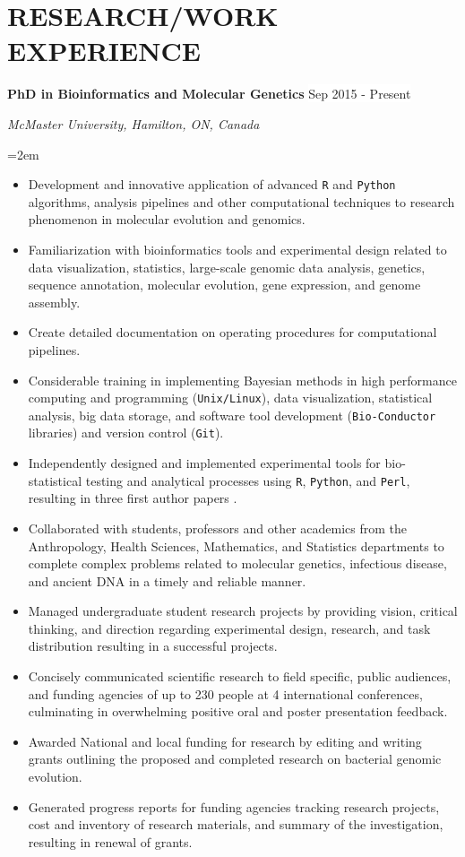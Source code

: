 \documentclass[paper=a4,fontsize=11pt]{scrartcl}	 			%
\newcommand{\NewPart}[1]{\section*{\uppercase{#1}}}
\newcommand{\EducationEntry}[4]{
		\noindent \textbf{#1} \hfill 					%
		\colorbox{White}{%
			\parbox{10em}{%
			\hfill\color{Black}#2}} \par				%
		\noindent \textit{#3} \par					%
		\noindent\hangindent=2em\hangafter=0 \small #4 	%
		\normalsize \par}
\newcommand{\WorkEntry}[4]{						%
		\noindent \textbf{#1} \hfill 					%
		\colorbox{White}{\color{Black}#2} \par		%
		\noindent \textit{#3} \par					%
		\noindent\hangindent=2em\hangafter=0 \small #4 	%
		\normalsize \par}
\begin{document}
\NewPart{Research/Work Experience}{}
\WorkEntry{PhD in Bioinformatics and Molecular Genetics}{Sep 2015 - Present}{McMaster University, Hamilton, ON, Canada}{
	\begin{itemize}
		\item Development and innovative application of advanced \texttt{R} and \texttt{Python} algorithms, analysis pipelines and other computational techniques to research phenomenon in molecular evolution and genomics.
		\item Familiarization with bioinformatics tools and experimental design related to data visualization, statistics, large-scale genomic data analysis, genetics, sequence annotation, molecular evolution, gene expression, and genome assembly.
		\item Create detailed documentation on operating procedures for computational pipelines.
		\item Considerable training in implementing Bayesian methods in high performance computing and programming (\texttt{Unix/Linux}), data visualization, statistical analysis, big data storage, and software tool development (\texttt{Bio-Conductor} libraries) and version control (\texttt{Git}).
		\item Independently designed and implemented experimental tools for bio-statistical testing and analytical processes using \texttt{R}, \texttt{Python}, and \texttt{Perl}, resulting in three first author papers \cite{LatoD:20,Lat:20,Lato:20}.
		\item Collaborated with students, professors and other academics from the Anthropology, Health Sciences, Mathematics, and Statistics departments to complete complex problems related to molecular genetics, infectious disease, and ancient DNA in a timely and reliable manner. 
		\item Managed undergraduate student research projects by providing vision, critical thinking, and direction regarding experimental design, research, and task distribution resulting in a successful projects.
		\item Concisely communicated scientific research to field specific, public audiences, and funding agencies of up to 230 people at 4 international conferences, culminating in overwhelming positive oral and poster presentation feedback.
		\item Awarded National and local funding for research by editing and writing grants outlining the proposed and completed research on bacterial genomic evolution.
		\item Generated progress reports for funding agencies tracking research projects, cost and inventory of research materials, and summary of the investigation, resulting in renewal of grants.
\end{itemize}}
\end{document}
